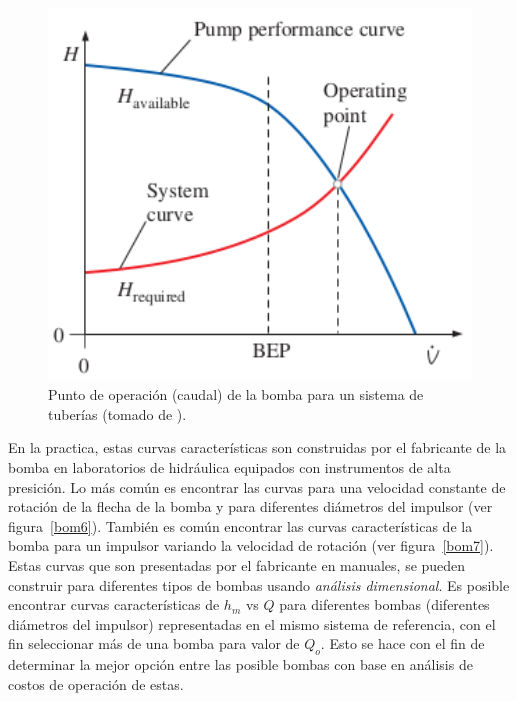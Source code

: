\documentclass[11pt, oneside]{article}
\begin{document}
\begin{figure}[h]
\centering
\includegraphics[width=12cm]{./figs/bom5b.png}
\caption{Punto de operaci\'on (caudal) de la bomba para un sistema de tuber\'ias (tomado de \cite{cengel2013ebook}).} 
\label{bom5b}
\end{figure}

En la practica, estas curvas caracter\'isticas son construidas por el fabricante de la bomba en laboratorios de hidr\'aulica  equipados con instrumentos de alta presici\'on. Lo m\'as com\'un es encontrar las curvas para una velocidad constante de rotaci\'on de la flecha de la bomba y para diferentes di\'ametros del impulsor (ver figura~\ref{bom6}). Tambi\'en es com\'un encontrar las curvas caracter\'isticas de la bomba para un impulsor variando la velocidad de rotaci\'on (ver figura~\ref{bom7}). Estas curvas que son presentadas por el fabricante en manuales, se pueden construir para diferentes tipos de bombas usando \emph{an\'alisis dimensional}. Es posible encontrar curvas caracter\'isticas de $h_m$ vs $Q$ para diferentes bombas (diferentes di\'ametros del impulsor) representadas en el mismo sistema de referencia, con el fin seleccionar m\'as de una bomba para valor de $Q_o$. Esto se hace con el fin de determinar la mejor opci\'on entre las posible bombas con base en an\'alisis de costos de operaci\'on de estas.    
\end{document}
